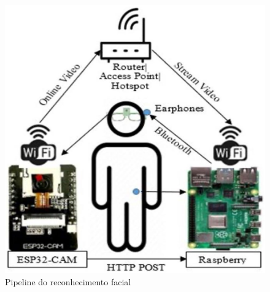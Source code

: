 \begin{figure}[htb]
	\begin{center}
		\includegraphics[scale=0.15]{Imagens/pipiline-espcam-alzheimer}
	\end{center}
	\caption {\label{pipeline_espcam}Pipeline do reconhecimento facial}
\end{figure}
